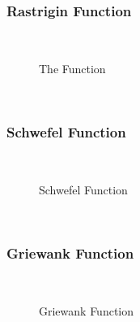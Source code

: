 \subsubsection{Rastrigin Function}
~
\begin{figure}[ht]
	\centering
	\setlength \fboxsep{0pt}
	\setlength \fboxrule{0.5pt}
	\caption{The Function}
	\label{fig:RastriginGraph}
\end{figure}
~
\subsubsection{Schwefel Function}
~
\begin{figure}[ht]
	\centering
	\setlength \fboxsep{0pt}
	\setlength \fboxrule{0.5pt}
	\caption{Schwefel Function}
	\label{fig:SchwefelGraph}
\end{figure}
~
\subsubsection{Griewank Function}
~
\begin{figure}[ht]
	\centering
	\setlength \fboxsep{0pt}
	\setlength \fboxrule{0.5pt}
	\caption{Griewank Function}
	\label{fig:GriewankGraph}
\end{figure}
~
